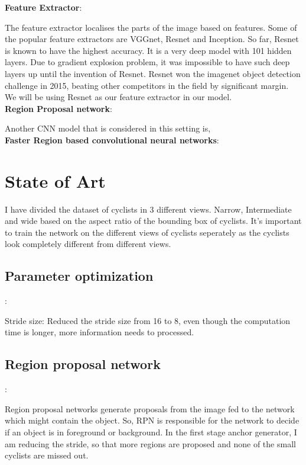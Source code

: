 \documentclass[11pt]{article}\usepackage[]{graphicx}\usepackage[]{color}
\begin{document}
\textbf{Feature Extractor}:

The feature extractor localises the parts of the image based on features. Some of the popular feature extractors
are VGGnet, Resnet and Inception. So far, Resnet is known to have the highest accuracy. It is a very deep model with 101 hidden layers. Due to gradient explosion problem, it was impossible to have such deep layers up until the invention of Resnet. Resnet won the imagenet object detection challenge in 2015, beating other competitors in the field by significant margin. We will be using Resnet as our feature extractor in our model.\\

\textbf{Region Proposal network}:



Another CNN model that is considered in this setting is,\\
\textbf{Faster Region based convolutional neural networks}:\\





\section{State of Art}
I have divided the dataset of cyclists in 3 different views. Narrow, Intermediate and wide
based on the aspect ratio of the bounding box of cyclists. It's important to train the network
on the different views of cyclists seperately as the cyclists look completely different from
different views.\\

\subsection{Parameter optimization}:

Stride size:  Reduced the stride size from 16 to 8, even though the computation time is longer,
more information needs to processed. \\

\subsection{Region proposal network}:

Region proposal networks generate proposals from the image fed to the network which might contain the object. So, RPN is responsible for the network to decide if an object is in foreground or background.
In the first stage anchor generator, I am reducing the stride, so that more regions are proposed and none of the small cyclists are missed out.\\
\end{document}
